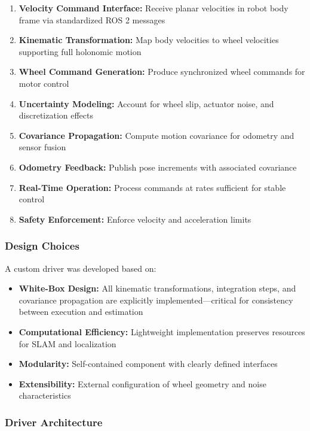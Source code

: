 \begin{enumerate}
    \item \textbf{Velocity Command Interface:} Receive planar velocities in robot body frame via standardized ROS 2 messages
    \item \textbf{Kinematic Transformation:} Map body velocities to wheel velocities supporting full holonomic motion
    \item \textbf{Wheel Command Generation:} Produce synchronized wheel commands for motor control
    \item \textbf{Uncertainty Modeling:} Account for wheel slip, actuator noise, and discretization effects
    \item \textbf{Covariance Propagation:} Compute motion covariance for odometry and sensor fusion
    \item \textbf{Odometry Feedback:} Publish pose increments with associated covariance
    \item \textbf{Real-Time Operation:} Process commands at rates sufficient for stable control
    \item \textbf{Safety Enforcement:} Enforce velocity and acceleration limits
\end{enumerate}

\subsubsection{Design Choices}

A custom driver was developed based on:
\begin{itemize}
    \item \textbf{White-Box Design:} All kinematic transformations, integration steps, and covariance propagation are explicitly implemented---critical for consistency between execution and estimation
    \item \textbf{Computational Efficiency:} Lightweight implementation preserves resources for SLAM and localization
    \item \textbf{Modularity:} Self-contained component with clearly defined interfaces
    \item \textbf{Extensibility:} External configuration of wheel geometry and noise characteristics
\end{itemize}

\subsubsection{Driver Architecture}

